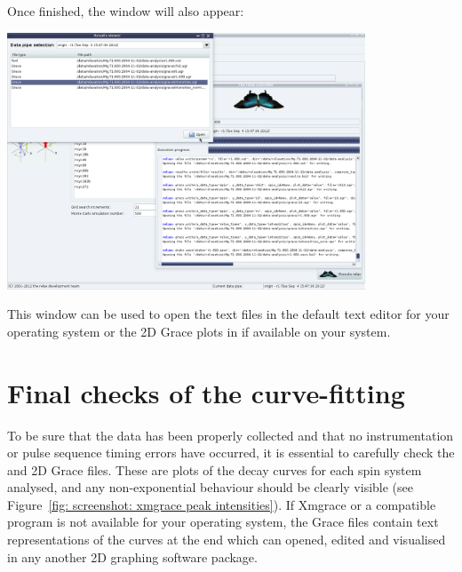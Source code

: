 Once finished, the  window will also appear:

\begin{minipage}[h]{\linewidth}
\centerline{\includegraphics[width=0.8\textwidth, bb=14 14 1415 1019]{graphics/screenshots/r1_analysis/fin}}
\end{minipage}

This window can be used to open the text files in the default text editor for your operating system or the 2D Grace plots in  if available on your system.




\section{Final checks of the curve-fitting}

To be sure that the data has been properly collected and that no instrumentation or pulse sequence timing errors have occurred, it is essential to carefully check the  and  2D Grace files.  These are plots of the decay curves for each spin system analysed, and any non-exponential behaviour should be clearly visible (see Figure~\ref{fig: screenshot: xmgrace peak intensities}).  If Xmgrace or a compatible program is not available for your operating system, the Grace files contain text representations of the curves at the end which can opened, edited and visualised in any another 2D graphing software package.
 
